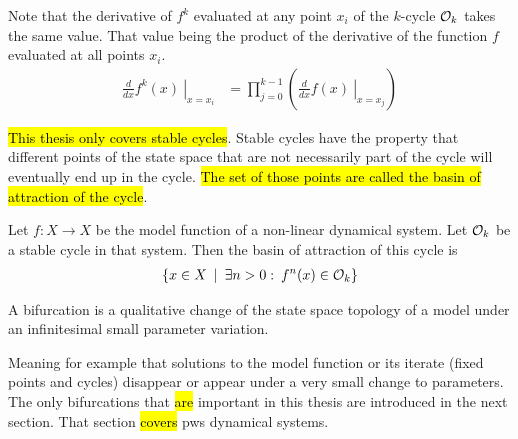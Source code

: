 Note that the derivative of $f^k$ evaluated at any point $x_i$ of the $k$-cycle $\mathcal{O}_k$ takes the same value.
That value being the product of the derivative of the function $f$ evaluated at all points $x_i$.
\begin{align}
	\left. \frac{d}{dx}f^k(x) \:\right|_{x = x_i} & = \prod_{j=0}^{k-1} \left( \left. \frac{d}{dx} f(x) \:\right|_{x = x_j} \right)
\end{align}

\hl{This thesis only covers stable cycles}.
Stable cycles have the property that different points of the state space that are not necessarily part of the cycle will eventually end up in the cycle.
\hl{The set of those points are called the basin of attraction of the cycle}.

\begin{definition}
	Let $f: X \to X$ be the model function of a non-linear dynamical system.
	Let $\mathcal{O}_k$ be a stable cycle in that system.
	Then the basin of attraction of this cycle is
	\begin{align}
		\left\{x \in X \:\mid\: \exists n > 0: \:f^n(x) \in \mathcal{O}_k\right\}
	\end{align}
\end{definition}

\begin{definition}[Bifurcation]
	A bifurcation is a qualitative change of the state space topology of a model under an infinitesimal small parameter variation.
\end{definition}
Meaning for example that solutions to the model function or its iterate (fixed points and cycles) disappear or appear under a very small change to parameters.
The only bifurcations that \hl{are} important in this thesis are introduced in the next section.
That section \hl{covers} \gls{pws} dynamical systems.
